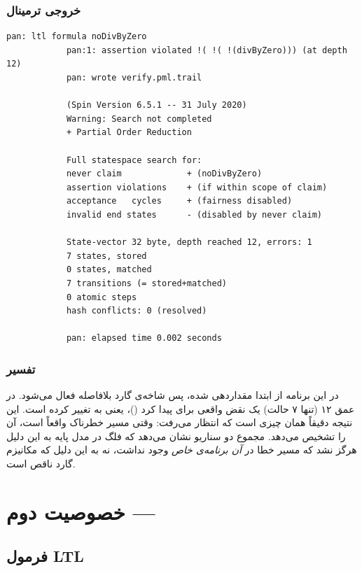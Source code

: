 \documentclass[12pt]{report}
\begin{document}
	\subsubsection{خروجی ترمینال}
	\begin{latin}
		\begin{lstlisting}[style=termstyle]
			pan: ltl formula noDivByZero
			pan:1: assertion violated !( !( !(divByZero))) (at depth 12)
			pan: wrote verify.pml.trail
			
			(Spin Version 6.5.1 -- 31 July 2020)
			Warning: Search not completed
			+ Partial Order Reduction
			
			Full statespace search for:
			never claim             + (noDivByZero)
			assertion violations    + (if within scope of claim)
			acceptance   cycles     + (fairness disabled)
			invalid end states      - (disabled by never claim)
			
			State-vector 32 byte, depth reached 12, errors: 1
			7 states, stored
			0 states, matched
			7 transitions (= stored+matched)
			0 atomic steps
			hash conflicts: 0 (resolved)
			
			pan: elapsed time 0.002 seconds
		\end{lstlisting}
	\end{latin}
	
	\subsubsection{تفسیر}
	در این برنامه  از ابتدا مقداردهی شده، پس شاخه‌ی گارد بلافاصله فعال می‌شود.  در عمق ۱۲ (تنها ۷ حالت) یک نقض واقعی برای  پیدا کرد ()، یعنی  به  تغییر کرده است. این نتیجه دقیقاً همان چیزی است که انتظار می‌رفت: وقتی مسیر خطرناک واقعاً  است،  آن را تشخیص می‌دهد. مجموع دو سناریو نشان می‌دهد که فلگ  در مدل پایه به این دلیل هرگز  نشد که مسیر خطا در \emph{آن برنامه‌ی خاص} وجود نداشت، نه به این دلیل که مکانیزم گارد ناقص است.
	
	\section{خصوصیت دوم --- }
	
	\subsection{فرمول LTL}
	
\end{document}
